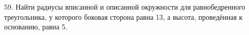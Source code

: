 59. Найти радиусы вписанной и описанной окружности для равнобедренного треугольника, у которого боковая сторона равна 13, а высота, проведённая к основанию, равна 5.\\
